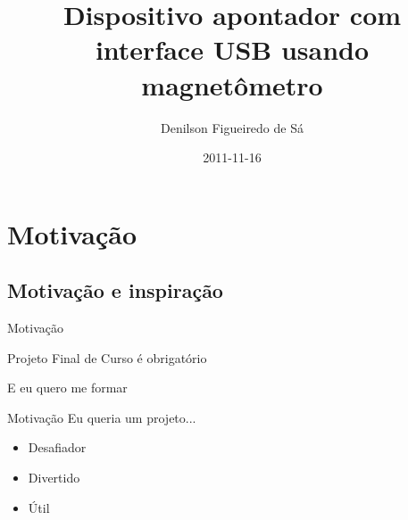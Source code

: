 \documentclass{beamer}
\title{Dispositivo apontador com interface USB usando magnetômetro}
\author{Denilson Figueiredo de Sá}
\date{2011-11-16}
\institute{DCC/UFRJ}
\begin{document}
\begin{frame}
	\titlepage
\end{frame}


\section{Motivação}

\subsection{Motivação e inspiração}

\begin{frame}{Motivação}
	\begin{center}
		\pause
		\Large{Projeto Final de Curso é obrigatório}

		\pause
		\bigskip

		\Large{E eu quero me formar}
	\end{center}
\end{frame}


\begin{frame}{Motivação}
	Eu queria um projeto...
	\pause
	\begin{itemize}[<+->]
		\item Desafiador
		\item Divertido
		\item Útil
	\end{itemize}
\end{frame}
\end{document}

